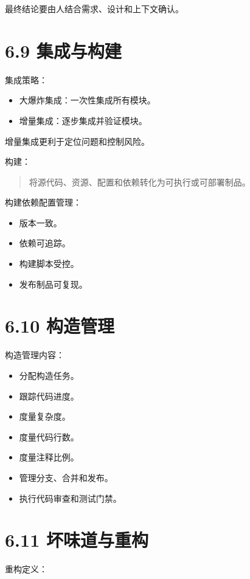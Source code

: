 \documentclass[UTF8,zihao=-4]{ctexart}
\begin{document}
最终结论要由人结合需求、设计和上下文确认。

\section{6.9 集成与构建}

集成策略：

\begin{itemize}
\item 大爆炸集成：一次性集成所有模块。
\item 增量集成：逐步集成并验证模块。
\end{itemize}

增量集成更利于定位问题和控制风险。

构建：

\begin{quote}
将源代码、资源、配置和依赖转化为可执行或可部署制品。
\end{quote}

构建依赖配置管理：

\begin{itemize}
\item 版本一致。
\item 依赖可追踪。
\item 构建脚本受控。
\item 发布制品可复现。
\end{itemize}

\section{6.10 构造管理}

构造管理内容：

\begin{itemize}
\item 分配构造任务。
\item 跟踪代码进度。
\item 度量复杂度。
\item 度量代码行数。
\item 度量注释比例。
\item 管理分支、合并和发布。
\item 执行代码审查和测试门禁。
\end{itemize}

\section{6.11 坏味道与重构}

重构定义：
\end{document}
